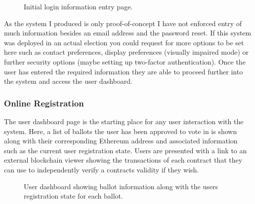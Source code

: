 \documentclass{article}
\begin{document}
\begin{figure}[h]
	\noindent
	\vspace{-0.25cm}
	\caption{Initial login information entry page.}
\end{figure}

As the system I produced is only proof-of-concept I have not enforced entry of much information besides an email address and the password reset. If this system was deployed in an actual election you could request for more options to be set here such as contact preferences, display preferences (visually impaired mode) or further security options (maybe setting up two-factor authentication). Once the user has entered the required information they are able to proceed further into the system and access the user dashboard.
 
\clearpage
\subsubsection{Online Registration}
The user dashboard page is the starting place for any user interaction with the system. Here, a list of ballots the user has been approved to vote in is shown along with their corresponding Ethereum address and associated information such as the current user registration state. Users are presented with a link to an external blockchain viewer showing the transactions of each contract that they can use to independently verify a contracts validity if they wish.

\begin{figure}[h]
	\noindent
	\vspace{-0.25cm}
	\caption{User dashboard showing ballot information along with the users registration state for each ballot.}
\end{figure}
\end{document}

